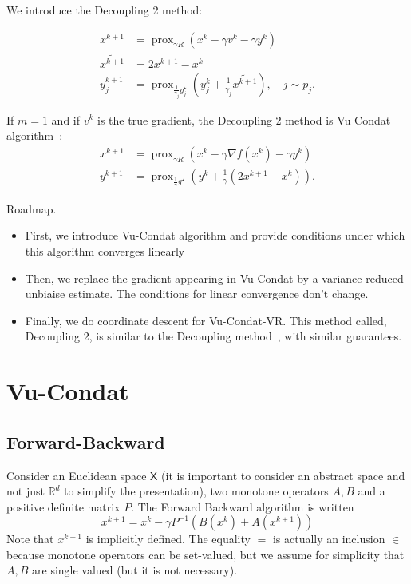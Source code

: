 \documentclass{article}
\newcommand{\adil}[1]{\todo[inline]{\textbf{Adil: }#1}}
\DeclareMathOperator{\prox}{prox}
\newcommand{\bR}{{\mathbb R}}
\newcommand{\sX}{{\mathsf X}}
\theoremstyle{definition}
\begin{document}
We introduce the Decoupling 2 method:

\begin{align}
    x^{k+1}   &= \prox_{\gamma R}(x^k - \gamma v^k - \gamma y^k)\\
    \widetilde{x^{k+1}} &= 2x^{k+1} - x^k\\
    y_j^{k+1} &= \prox_{\frac{1}{\gamma_j} g_j^\star}(y_j^k + \frac{1}{\gamma_j}\widetilde{x^{k+1}} ), \quad j \sim p_j.
\end{align}

If $m=1$ and if $v^k$ is the true gradient, the Decoupling 2 method is Vu Condat algorithm~\cite{con-jota13}:
\begin{align}
    x^{k+1}   &= \prox_{\gamma R}(x^k - \gamma \nabla f(x^k) - \gamma y^k)\\
    y^{k+1} &= \prox_{\frac{1}{\gamma} g^\star}(y^k + \frac{1}{\gamma}(2x^{k+1}-x^k)).
\end{align}



Roadmap.
\begin{itemize}
    \item First, we introduce Vu-Condat algorithm and provide conditions under which this algorithm converges linearly
    \item Then, we replace the gradient appearing in Vu-Condat by a variance reduced unbiaise estimate. The conditions for linear convergence don't change.
    \item Finally, we do coordinate descent for Vu-Condat-VR. This method called, Decoupling 2, is similar to the Decoupling method~\cite{mishchenko2019stochastic}, with similar guarantees. 
\end{itemize}

\section{Vu-Condat}
\subsection{Forward-Backward}
Consider an Euclidean space $\sX$ (it is important to consider an abstract space and not just $\bR^d$ to simplify the presentation), two monotone operators $A,B$ and a positive definite matrix $P$.
The Forward Backward algorithm is written
\begin{equation}
    \label{eq:FB}
    x^{k+1} = x^k - \gamma P^{-1} (B(x^k) + A(x^{k+1}))
\end{equation}
Note that $x^{k+1}$ is implicitly defined. The equality $=$ is actually an inclusion $\in$ because monotone operators can be set-valued, but we assume for simplicity that $A,B$ are single valued (but it is not necessary).
\end{document}
